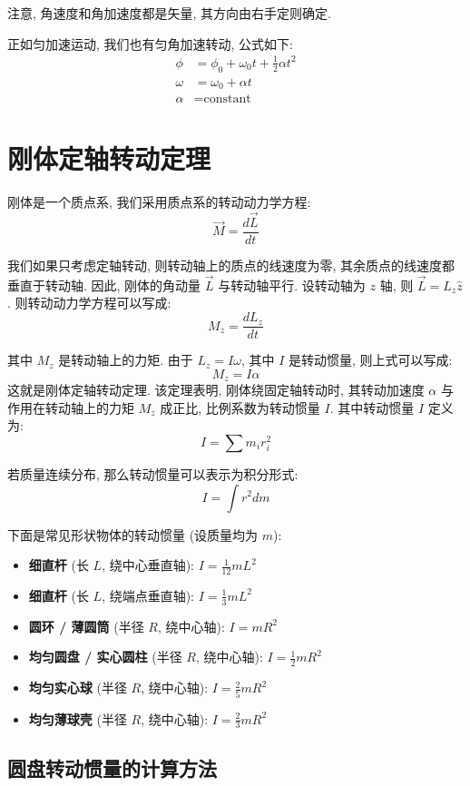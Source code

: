 \documentclass[
  a4paper,
]{ctexrep}
\providecommand{\tightlist}{%
  \setlength{\itemsep}{0pt}\setlength{\parskip}{0pt}}
\begin{document}
注意, 角速度和角加速度都是矢量, 其方向由右手定则确定.

正如匀加速运动, 我们也有匀角加速转动, 公式如下: \[\begin{aligned}
\phi &= \phi_0 + \omega_0 t + \frac{1}{2} \alpha t^2 \\
\omega &= \omega_0 + \alpha t \\
\alpha &= \text{constant}
\end{aligned}\]

\section{刚体定轴转动定理}\label{ux521aux4f53ux5b9aux8f74ux8f6cux52a8ux5b9aux7406}

刚体是一个质点系, 我们采用质点系的转动动力学方程: \[
\vec{M} = \frac{d\vec{L}}{dt}
\]

我们如果只考虑定轴转动, 则转动轴上的质点的线速度为零,
其余质点的线速度都垂直于转动轴. 因此, 刚体的角动量 \(\vec{L}\)
与转动轴平行. 设转动轴为 \(z\) 轴, 则 \(\vec{L} = L_z \hat{z}\).
则转动动力学方程可以写成: \[
M_z = \frac{dL_z}{dt}
\]

其中 \(M_z\) 是转动轴上的力矩. 由于 \(L_z = I \omega\), 其中 \(I\)
是转动惯量, 则上式可以写成: \[
M_z = I \alpha
\] 这就是刚体定轴转动定理. 该定理表明, 刚体绕固定轴转动时, 其转动加速度
\(\alpha\) 与作用在转动轴上的力矩 \(M_z\) 成正比, 比例系数为转动惯量
\(I\). 其中转动惯量 \(I\) 定义为: \[
I = \sum m_i r_i^2
\]

若质量连续分布, 那么转动惯量可以表示为积分形式: \[
I = \int r^2 dm
\]

下面是常见形状物体的转动惯量 (设质量均为 \(m\)):

\begin{itemize}
\tightlist
\item
  \textbf{细直杆} (长 \(L\), 绕中心垂直轴): \(I = \frac{1}{12}mL^2\)
\item
  \textbf{细直杆} (长 \(L\), 绕端点垂直轴): \(I = \frac{1}{3}mL^2\)
\item
  \textbf{圆环 / 薄圆筒} (半径 \(R\), 绕中心轴): \(I = mR^2\)
\item
  \textbf{均匀圆盘 / 实心圆柱} (半径 \(R\), 绕中心轴):
  \(I = \frac{1}{2}mR^2\)
\item
  \textbf{均匀实心球} (半径 \(R\), 绕中心轴): \(I = \frac{2}{5}mR^2\)
\item
  \textbf{均匀薄球壳} (半径 \(R\), 绕中心轴): \(I = \frac{2}{3}mR^2\)
\end{itemize}

\subsection{圆盘转动惯量的计算方法}\label{ux5706ux76d8ux8f6cux52a8ux60efux91cfux7684ux8ba1ux7b97ux65b9ux6cd5}
\end{document}
